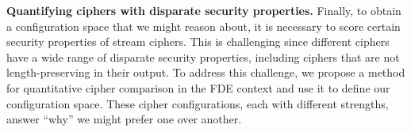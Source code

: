 \textbf{Quantifying ciphers with disparate security properties.} Finally, to
obtain a configuration space that we might reason about, it is necessary to
score certain security properties of stream ciphers. This is challenging since
different ciphers have a wide range of disparate security properties, including
ciphers that are not length-preserving in their output. To address this
challenge, we propose a method for quantitative cipher comparison in the FDE
context and use it to define our configuration space. These cipher
configurations, each with different strengths, answer ``why'' we might prefer
one over another.
